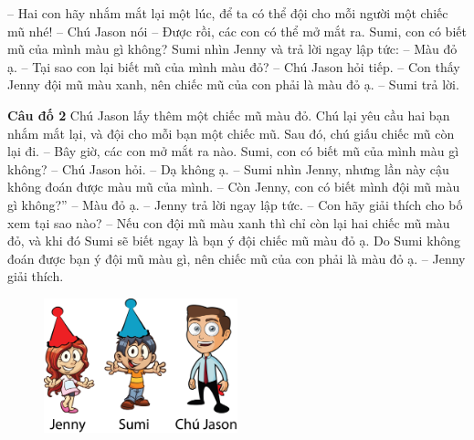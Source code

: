 \begin{adjustwidth}{130pt}{0pt}
	-- Hai con hãy nhắm mắt lại một lúc, để ta có thể đội cho mỗi người một chiếc mũ nhé! -- Chú Jason nói
	-- Được rồi, các con có thể mở mắt ra. Sumi, con có biết mũ của mình màu gì không?
	\vskip 0.1cm
	Sumi nhìn Jenny và trả lời ngay lập tức:
	\vskip 0.1cm
	-- Màu đỏ ạ.
	\vskip 0.1cm
	-- Tại sao con lại biết mũ của mình màu đỏ? -- Chú Jason hỏi tiếp.
	\vskip 0.1cm
	-- Con thấy Jenny đội mũ màu xanh, nên chiếc mũ của con phải là màu đỏ ạ. -- Sumi trả lời.
\end{adjustwidth}
\newpage
	\textbf{Câu đố 2}
	\vskip 0.1cm
	Chú Jason lấy thêm một chiếc mũ màu đỏ. Chú lại yêu cầu hai bạn nhắm mắt lại, và đội cho mỗi bạn một chiếc mũ. Sau đó, chú giấu chiếc mũ còn lại đi.
	\vskip 0.1cm
	-- Bây giờ, các con mở mắt ra nào. Sumi, con có biết mũ của mình màu gì không? -- Chú  Jason hỏi.
	\vskip 0.1cm
	-- Dạ không ạ. -- Sumi nhìn Jenny, nhưng lần này cậu không đoán được màu mũ của mình.
	\vskip 0.1cm
	-- Còn Jenny, con có biết mình đội mũ màu  gì không?”
	\vskip 0.1cm
	-- Màu đỏ ạ. -- Jenny trả lời ngay lập tức.
	\vskip 0.1cm
	-- Con hãy giải thích cho bố xem tại sao nào?
	\vskip 0.1cm
	-- Nếu con đội mũ màu xanh thì chỉ còn lại hai chiếc mũ màu đỏ, và khi đó Sumi sẽ biết ngay là bạn ý đội chiếc mũ màu đỏ ạ. Do Sumi không đoán được bạn ý đội mũ màu gì, nên chiếc mũ của con phải là màu đỏ ạ. – Jenny giải thích.
		\begin{figure}[H]
		\centering
		\vspace*{-5pt}
		\captionsetup{labelformat= empty, justification=centering}
		\includegraphics[width=0.5\textwidth]{h2}
		\vspace*{-10pt}
		\end{figure}
